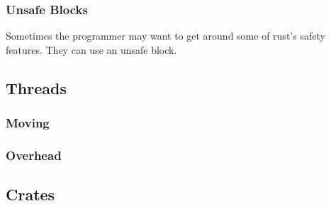 \subsubsection{Unsafe Blocks}
Sometimes the programmer may want to get around some of rust's safety features. They can use an unsafe block.


\subsection{Threads}
\subsubsection{Moving}
\subsubsection{Overhead}

\subsection{Crates}
